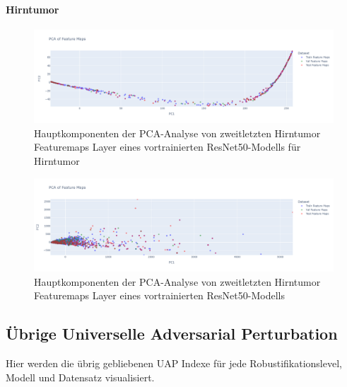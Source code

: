 \paragraph*{Hirntumor}

\begin{figure}[H]
    \centering
    \includegraphics[width=\linewidth]{01-images/06-ending/brain-all-feautremap-pca-ourmodel-resnet50.png}
    \caption{Hauptkomponenten der PCA-Analyse von zweitletzten Hirntumor Featuremaps Layer eines vortrainierten ResNet50-Modells für Hirntumor}
    \label{fig:brain-feautremap-pca-ourmodel-resnet50}
\end{figure}

\begin{figure}[H]
    \centering
    \includegraphics[width=\linewidth]{01-images/06-ending/brain-all-feautremap-pca-model-resnet50.png}
    \caption{Hauptkomponenten der PCA-Analyse von zweitletzten Hirntumor Featuremaps Layer eines vortrainierten ResNet50-Modells}
    \label{fig:brain-feautremap-pca-model-resnet50}
\end{figure}

\newpage

\subsection*{Übrige Universelle Adversarial Perturbation} \label{appendix:übrige-uaps}
Hier werden die übrig gebliebenen UAP Indexe für jede Robustifikationslevel, Modell und Datensatz visualisiert. 

